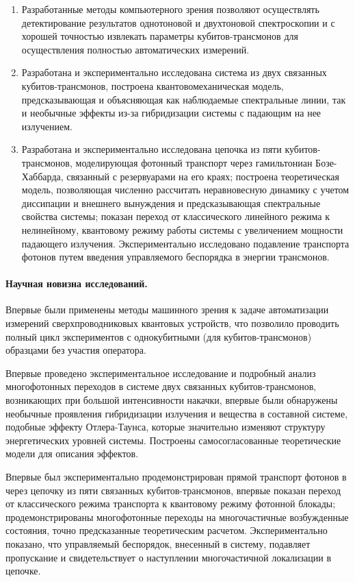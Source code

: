 \documentclass[14pt, a4paper]{extarticle}
\begin{document}
\begin{enumerate}
	\item Разработанные методы компьютерного зрения позволяют осуществлять детектирование результатов однотоновой и двухтоновой спектроскопии и с хорошей точностью извлекать параметры кубитов-трансмонов для осуществления полностью автоматических измерений.
	\item Разработана и экспериментально исследована система из двух связанных кубитов\hyp трансмонов, построена квантовомеханическая модель, предсказывающая и объясняющая как наблюдаемые спектральные линии, так и необычные эффекты из-за гибридизации системы с падающим на нее излучением.
	\item Разработана и экспериментально исследована цепочка из пяти кубитов\hyp трансмонов, моделирующая фотонный транспорт через гамильтониан Бозе\hyp Хаббарда, связанный с резервуарами на его краях; построена теоретическая модель, позволяющая численно рассчитать неравновесную динамику с учетом диссипации и внешнего вынуждения и предсказывающая спектральные свойства системы; показан переход от классического линейного режима к нелинейному, квантовому режиму работы системы с увеличением мощности падающего излучения. Экспериментально исследовано подавление транспорта фотонов путем введения управляемого беспорядка в энергии трансмонов.
\end{enumerate}
	
\paragraph{Научная новизна исследований.} Впервые были применены методы машинного зрения к задаче автоматизации измерений сверхпроводниковых квантовых устройств, что позволило проводить полный цикл экспериментов с однокубитными (для кубитов\hyp трансмонов) образцами без участия оператора.

Впервые проведено экспериментальное исследование и  подробный анализ многофотонных переходов в системе двух связанных кубитов\hyp трансмонов, возникающих при большой интенсивности накачки, впервые были обнаружены необычные проявления гибридизации излучения и вещества в составной системе, подобные эффекту Отлера\hyp Таунса, которые значительно изменяют структуру энергетических уровней системы. Построены самосогласованные теоретические модели для описания эффектов.

Впервые был экспериментально продемонстрирован прямой транспорт фотонов в через цепочку из пяти связанных кубитов\hyp трансмонов, впервые показан переход от классического режима транспорта к квантовому режиму фотонной блокады; продемонстрированы многофотонные переходы на многочастичные возбужденные состояния, точно предсказанные теоретическим расчетом. Экспериментально показано, что управляемый беспорядок, внесенный в систему, подавляет пропускание и свидетельствует о наступлении многочастичной локализации в цепочке.
\end{document}
